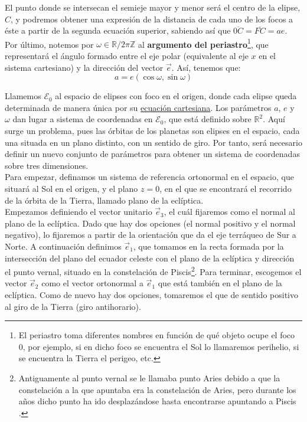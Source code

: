 El punto donde se intersecan el semieje mayor y menor será el centro de la elipse, $C$, y podremos obtener una expresión de la distancia de cada uno de los focos a éste a partir de la segunda ecuación superior, sabiendo así que $\overline{0C}=\overline{FC}=ae$.\\

Por último, notemos por $\omega\in\mathbb{R}/2\pi\mathbb{Z}$ al \textbf{argumento del periastro}\footnote{El periastro toma diferentes nombres en función de qué objeto ocupe el foco 0, por ejemplo, si en dicho foco se encuentra el Sol lo llamaremos perihelio, si se encuentra la Tierra el perigeo, etc.}, que representará el ángulo formado entre el eje polar (equivalente al eje $x$ en el sistema cartesiano) y la dirección del vector $\vec{e}$. Así, tenemos que:
\[
a=e(\cos{\omega},\sin{\omega})
\]

Llamemos $\mathcal{E}_0$ al espacio de elipses con foco en el origen, donde cada elipse queda determinada de manera única por su \hyperref[eq:elipse_cartesiana]{ecuación cartesiana}. Los parámetros $a$, $e$ y $\omega$ dan lugar a sistema de coordenadas en $\mathcal{E}_0$, que está definido sobre $\mathbb{R}^2$. Aquí surge un problema, pues las órbitas de los planetas son elipses en el espacio, cada una situada en un plano distinto, con un sentido de giro. Por tanto, será necesario definir un nuevo conjunto de parámetros para obtener un sistema de coordenadas sobre tres dimensiones.\\

Para empezar, definamos un sistema de referencia ortonormal en el espacio, que situará al Sol en el origen, y el plano $z=0$, en el que se encontrará el recorrido de la órbita de la Tierra, llamado plano de la eclíptica.\\

Empezamos definiendo el vector unitario $\vec{e}_3$, el cuál fijaremos como el normal al plano de la eclíptica. Dado que hay dos opciones (el normal positivo y el normal negativo), lo fijaremos a partir de la orientación que da el eje terráqueo de Sur a Norte. A continuación definimos $\vec{e}_1$, que tomamos en la recta formada por la intersección del plano del ecuador celeste con el plano de la eclíptica y dirección el punto vernal, situado en la constelación de Piscis\footnote{Antiguamente al punto vernal se le llamaba punto Aries debido a que la constelación a la que apuntaba era la constelación de Aries, pero durante los años dicho punto ha ido desplazándose hasta encontrarse apuntando a Piscis \cite{piscis}.}. Para terminar, escogemos el vector $\vec{e}_2$ como el vector ortonormal a $\vec{e}_1$ que está también en el plano de la eclíptica. Como de nuevo hay dos opciones, tomaremos el que de sentido positivo al giro de la Tierra (giro antihorario).\\

